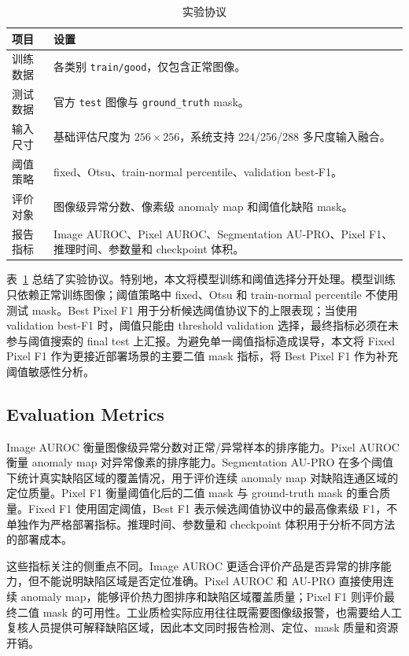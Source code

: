 \documentclass[letterpaper]{article}
\begin{document}
\begin{table}[t]
\centering
\caption{实验协议}
\footnotesize
\setlength{\tabcolsep}{4pt}
\begin{tabular}{p{}p{}}
\toprule
项目 & 设置 \\
\midrule
训练数据 & 各类别 \texttt{train/good}，仅包含正常图像。 \\
测试数据 & 官方 \texttt{test} 图像与 \texttt{ground\_truth} mask。 \\
输入尺寸 & 基础评估尺度为 \(256\times256\)，系统支持 224/256/288 多尺度输入融合。 \\
阈值策略 & fixed、Otsu、train-normal percentile、validation best-F1。 \\
评价对象 & 图像级异常分数、像素级 anomaly map 和阈值化缺陷 mask。 \\
报告指标 & Image AUROC、Pixel AUROC、Segmentation AU-PRO、Pixel F1、推理时间、参数量和 checkpoint 体积。 \\
\bottomrule
\end{tabular}
\label{tab:protocol}
\end{table}

表~\ref{tab:protocol} 总结了实验协议。特别地，本文将模型训练和阈值选择分开处理。模型训练只依赖正常训练图像；阈值策略中 fixed、Otsu 和 train-normal percentile 不使用测试 mask。Best Pixel F1 用于分析候选阈值协议下的上限表现；当使用 validation best-F1 时，阈值只能由 threshold validation 选择，最终指标必须在未参与阈值搜索的 final test 上汇报。为避免单一阈值指标造成误导，本文将 Fixed Pixel F1 作为更接近部署场景的主要二值 mask 指标，将 Best Pixel F1 作为补充阈值敏感性分析。

\subsection{Evaluation Metrics}

Image AUROC 衡量图像级异常分数对正常/异常样本的排序能力。Pixel AUROC 衡量 anomaly map 对异常像素的排序能力。Segmentation AU-PRO 在多个阈值下统计真实缺陷区域的覆盖情况，用于评价连续 anomaly map 对缺陷连通区域的定位质量。Pixel F1 衡量阈值化后的二值 mask 与 ground-truth mask 的重合质量。Fixed F1 使用固定阈值，Best F1 表示候选阈值协议中的最高像素级 F1，不单独作为严格部署指标。推理时间、参数量和 checkpoint 体积用于分析不同方法的部署成本。

这些指标关注的侧重点不同。Image AUROC 更适合评价产品是否异常的排序能力，但不能说明缺陷区域是否定位准确。Pixel AUROC 和 AU-PRO 直接使用连续 anomaly map，能够评价热力图排序和缺陷区域覆盖质量；Pixel F1 则评价最终二值 mask 的可用性。工业质检实际应用往往既需要图像级报警，也需要给人工复核人员提供可解释缺陷区域，因此本文同时报告检测、定位、mask 质量和资源开销。
\end{document}
